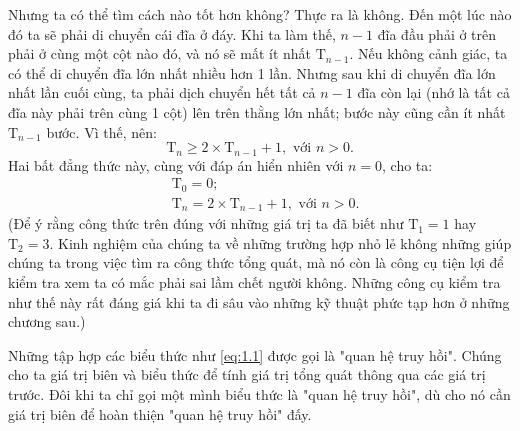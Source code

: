 
Nhưng ta có thể tìm cách nào tốt hơn không? Thực ra là không. Đến một lúc nào đó ta sẽ phải di chuyển cái đĩa ở đáy. Khi ta làm thế, $n - 1$ đĩa đầu phải ở trên phải ở cùng một cột nào đó, và nó sẽ mất ít nhất $\mathrm{T}_{n - 1}$. Nếu không cảnh giác, ta có thể di chuyển đĩa lớn nhất nhiều hơn 1 lần. Nhưng sau khi di chuyển đĩa lớn nhất lần cuối cùng, ta phải dịch chuyển hết tất cả $n - 1$ đĩa còn lại (nhớ là tất cả đĩa này phải trên cùng 1 cột) lên trên thằng lớn nhất; bước này cũng cần ít nhất $\mathrm{T}_{n - 1}$ bước. Vì thế, nên:
$$\mathrm{T}_n \ge 2 \times \mathrm{T}_{n - 1} + 1, \text{ \ \ \ \ với } n > 0.$$
Hai bất đẳng thức này, cùng với đáp án hiển nhiên với $n = 0$, cho ta:
\begin{equation}\label{eq:1.1}
    \begin{aligned}
        & \mathrm{T}_0 = 0; \\
        & \mathrm{T}_n = 2 \times \mathrm{T}_{n - 1} + 1, \text{ \ \ \ \ với } n > 0.
    \end{aligned}
\end{equation}
(Để ý rằng công thức trên đúng với những giá trị ta đã biết như $\mathrm{T}_1 = 1$ hay $\mathrm{T}_2 = 3$. Kinh nghiệm của chúng ta về những trường hợp nhỏ lẻ không những giúp chúng ta trong việc tìm ra công thức tổng quát, mà nó còn là công cụ tiện lợi để kiểm tra xem ta có mắc phải sai lầm chết người không. Những công cụ kiểm tra như thế này rất đáng giá khi ta đi sâu vào những kỹ thuật phức tạp hơn ở những chương sau.)

Những tập hợp các biểu thức như \eqref{eq:1.1} được gọi là
"quan hệ truy hồi". Chúng cho ta giá trị biên và biểu thức để tính giá trị tổng quát thông qua các giá trị trước. Đôi khi ta chỉ gọi một mình biểu thức là "quan hệ truy hồi", dù cho nó cần giá trị biên để hoàn thiện "quan hệ truy hồi" đấy. 

